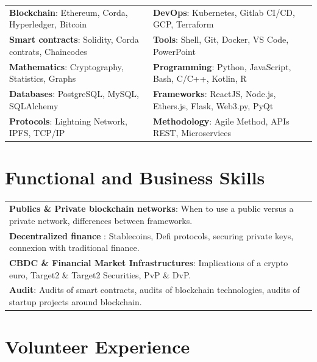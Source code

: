 \documentclass[10pt]{article}
\begin{document}
\vspace{2ex}

\begin{tabular}{ l l }
\textbf{Blockchain}: Ethereum, Corda, Hyperledger, Bitcoin & \textbf{DevOps}: Kubernetes, Gitlab CI/CD, GCP, Terraform \\[0.1cm]
\textbf{Smart contracts}: Solidity, Corda contrats, Chaincodes & \textbf{Tools}: Shell, Git, Docker, VS Code, PowerPoint \\[0.1cm]
\textbf{Mathematics}: Cryptography, Statistics, Graphs & \textbf{Programming}: Python, JavaScript, Bash, C/C++, Kotlin, R \\[0.1cm]
\textbf{Databases}: PostgreSQL, MySQL, SQLAlchemy & \textbf{Frameworks}: ReactJS, Node.js, Ethers.js, Flask, Web3.py, PyQt \\[0.1cm]
\textbf{Protocols}: Lightning Network, IPFS, TCP/IP & \textbf{Methodology}: Agile Method, APIs REST, Microservices \\[0.1cm]
\end{tabular}

\vspace{2ex}

\section*{Functional and Business Skills}

\vspace{2ex}

\begin{tabular}{ l }
\textbf{Publics \& Private blockchain networks}: When to use a public versus a private network, differences between frameworks.\\[0.1cm]
\textbf{Decentralized finance} : Stablecoins, Defi protocols, securing private keys, connexion with traditional finance.\\[0.1cm]
\textbf{CBDC \& Financial Market Infrastructures}: Implications of a crypto euro, Target2 \& Target2 Securities, PvP \& DvP.\\[0.1cm]
\textbf{Audit}: Audits of smart contracts, audits of blockchain technologies, audits of startup projects around blockchain.\\[0.1cm]
\end{tabular}

\vspace{1ex}

\section*{Volunteer Experience}
\end{document}
